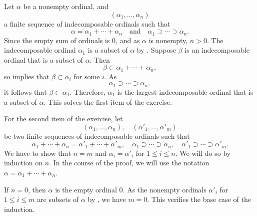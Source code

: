 \documentclass{article}
\begin{document}
\begin{solution}
  \label{sol:mb1t9epx}
  Let \(\alpha\) be a nonempty ordinal, and
  \begin{displaymath}
    (\alpha_1, \dotsc, \alpha_n)
  \end{displaymath}
  a finite sequence of indecomposable ordinals such that
  \begin{displaymath}
    \alpha = \alpha_1 + \dotsb + \alpha_n
    \quad \text{and} \quad
    \alpha_1 \supset \dotsb \supset \alpha_n.
  \end{displaymath}
  Since the empty sum of ordinals is \(0\), and as \(\alpha\) is
  nonempty, \(n > 0\).  The indecomposable ordinal \(\alpha_1\) is a
  subset of \(\alpha\) by .  Suppose \(\beta\) is
  an indecomposable ordinal that is a subset of \(\alpha\).  Then
  \begin{displaymath}
    \beta \subset \alpha_1 + \dotsb + \alpha_n,
  \end{displaymath}
  so  implies that \(\beta \subset \alpha_i\) for
  some \(i\).  As
  \begin{displaymath}
    \alpha_1 \supset \dotsb \supset \alpha_n,
  \end{displaymath}
  it follows that \(\beta \subset \alpha_1\).  Therefore, \(\alpha_1\)
  is the largest indecomposable ordinal that is a subset of
  \(\alpha\).  This solves the first item of the exercise.

  For the second item of the exercise, let
  \begin{displaymath}
    (\alpha_1, \dotsc, \alpha_n),
    \quad
    (\alpha'_1, \dotsc, \alpha'_m)
  \end{displaymath}
  be two finite sequences of indecomposable ordinals such that
  \begin{displaymath}
    \alpha_1 + \dotsb + \alpha_n = \alpha'_1 + \dotsb + \alpha'_m,
    \quad
    \alpha_1 \supset \dotsb \supset \alpha_n,
    \quad
    \alpha'_1 \supset \dotsb \supset \alpha'_m.
  \end{displaymath}
  We have to show that \(n = m\) and \(\alpha_i = \alpha'_i\) for
  \(1 \leq i \leq n\).  We will do so by induction on \(n\).  In the
  course of the proof, we will use the notation
  \(\alpha = \alpha_1 + \dotsb + \alpha_n\).

  If \(n = 0\), then \(\alpha\) is the empty ordinal \(0\).  As the
  nonempty ordinals \(\alpha'_i\) for \(1 \leq i \leq m\) are subsets
  of \(\alpha\) by , we have \(m = 0\).  This
  verifies the base case of the induction.


\end{solution}
\end{document}
